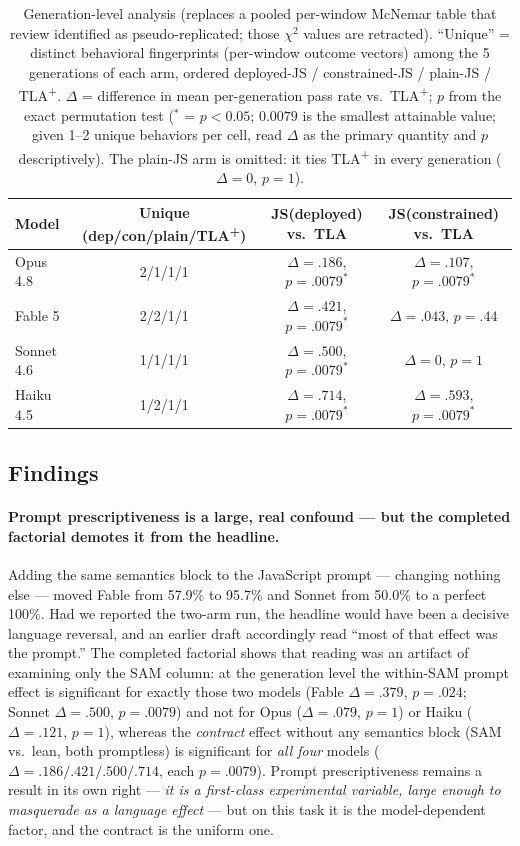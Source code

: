 \documentclass[11pt]{article}
\newcommand{\tlaplus}{TLA\texorpdfstring{\textsuperscript{+}}{+}}
\begin{document}
\begin{table}[ht]
\centering
\caption{Generation-level analysis (replaces a pooled per-window McNemar
table that review identified as pseudo-replicated; those $\chi^2$ values are
retracted). ``Unique'' = distinct behavioral fingerprints (per-window outcome
vectors) among the 5 generations of each arm, ordered deployed-JS /
constrained-JS / plain-JS / \tlaplus{}. $\Delta$ = difference in mean
per-generation pass rate vs.\ \tlaplus{}; $p$ from the exact permutation test
($^{*}$ = $p<0.05$; $0.0079$ is the smallest attainable value; given 1--2
unique behaviors per cell, read $\Delta$ as the primary quantity and $p$
descriptively). The plain-JS
arm is omitted: it ties \tlaplus{} in every generation ($\Delta{=}0$, $p{=}1$).}
\label{tab:mcnemar}
\small
\begin{tabular}{lccc}
\toprule
Model & Unique (dep/con/plain/\tlaplus{}) & JS(deployed) vs.\ TLA & JS(constrained) vs.\ TLA \\
\midrule
Opus 4.8   & 2/1/1/1 & $\Delta{=}.186$, $p{=}.0079^{*}$ & $\Delta{=}.107$, $p{=}.0079^{*}$ \\
Fable 5    & 2/2/1/1 & $\Delta{=}.421$, $p{=}.0079^{*}$ & $\Delta{=}.043$, $p{=}.44$ \\
Sonnet 4.6 & 1/1/1/1 & $\Delta{=}.500$, $p{=}.0079^{*}$ & $\Delta{=}0$, $p{=}1$ \\
Haiku 4.5  & 1/2/1/1 & $\Delta{=}.714$, $p{=}.0079^{*}$ & $\Delta{=}.593$, $p{=}.0079^{*}$ \\
\bottomrule
\end{tabular}
\end{table}

\subsection{Findings}

\paragraph{Prompt prescriptiveness is a large, real confound --- but the
completed factorial demotes it from the headline.}
Adding the same semantics block to the JavaScript prompt --- changing nothing
else --- moved Fable from 57.9\% to 95.7\% and Sonnet from 50.0\% to a
perfect 100\%. Had we reported the two-arm run, the headline would have been
a decisive language reversal, and an earlier draft accordingly read ``most of
that effect was the prompt.'' The completed factorial shows that reading
was an artifact of examining only the SAM column: at the generation level the
within-SAM prompt effect is significant for exactly those two models (Fable
$\Delta{=}.379$, $p{=}.024$; Sonnet $\Delta{=}.500$, $p{=}.0079$) and not for
Opus ($\Delta{=}.079$, $p{=}1$) or Haiku ($\Delta{=}.121$, $p{=}1$), whereas
the \emph{contract} effect without any semantics block (SAM vs.\ lean, both
promptless) is significant for \emph{all four} models
($\Delta{=}.186/.421/.500/.714$, each $p{=}.0079$). Prompt prescriptiveness
remains a result in its own right --- \emph{it is a first-class experimental
variable, large enough to masquerade as a language effect} --- but on this
task it is the model-dependent factor, and the contract is the uniform one.
\end{document}
